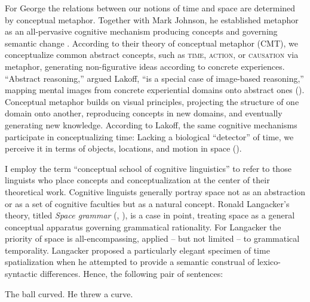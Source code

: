 \documentclass[output=paper]{langsci/langscibook}
\begin{document}
For George \citet{lakoff_contemporary_1993} the relations between our notions of time and space are determined by conceptual metaphor. Together with Mark Johnson, he established metaphor as an all-pervasive cognitive mechanism producing concepts and governing semantic change \citep{lakoff_metaphors_1980}. According to their theory of conceptual metaphor (CMT), we conceptualize common abstract concepts, such as \textsc{time}, \textsc{action}, or \textsc{causation} via metaphor, generating non-figurative ideas according to concrete experiences. “Abstract reasoning,” argued Lakoff, “is a special case of image-based reasoning,” mapping mental images from concrete experiential domains onto abstract ones (\citealt[229]{lakoff_contemporary_1993}). Conceptual metaphor builds on visual principles, projecting the structure of one domain onto another, reproducing concepts in new domains, and eventually generating new knowledge. According to Lakoff, the same cognitive mechanisms participate in conceptualizing time: Lacking a biological “detector” of time, we perceive it in terms of objects, locations, and motion in space (\citealt[218]{lakoff_contemporary_1993}).

I employ the term “conceptual school of cognitive linguistics” to refer to those linguists who place concepts and conceptualization at the center of their theoretical work. Cognitive linguists generally portray space not as an abstraction or as a set of cognitive faculties but as a natural concept. Ronald Langacker’s theory, titled \textit{Space grammar} (\citeyear{langacker_space_1982}, \citeyear{langacker_foundations_1987}), is a case in point, treating space as a general conceptual apparatus governing grammatical rationality. For Langacker the priority of space is all-encompassing, applied -- but not limited -- to grammatical temporality. Langacker proposed a particularly elegant specimen of time spatialization when he attempted to provide a semantic construal of lexico-syntactic differences. Hence, the following pair of sentences: 

\ea \label{ex:3:1} The ball curved.
\ex \label{ex:3:2} He threw a curve.
\z
         
\end{document}

